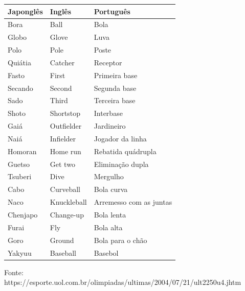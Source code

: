 		\begin{center}
			\begin{tabular}{lll}
				Japonglês & Inglês      & Português               \\\hline\hline
				Bora      & Ball        & Bola                    \\\hline
				Globo     & Glove       & Luva                    \\\hline
				Polo      & Pole        & Poste                   \\\hline
				Quiátia   & Catcher     & Receptor                \\\hline
				Fasto     & First       & Primeira base           \\\hline
				Secando   & Second      & Segunda base            \\\hline
				Sado      & Third       & Terceira base           \\\hline
				Shoto     & Shortstop   & Interbase               \\\hline
				Gaiá      & Outfielder  & Jardineiro              \\\hline
				Naiá      & Infielder   & Jogador da linha        \\\hline
				Homoran   & Home run    & Rebatida quádrupla      \\\hline
				Guetso    & Get two     & Eliminação dupla        \\\hline
				Tsuberi   & Dive        & Mergulho                \\\hline
				Cabo      & Curveball   & Bola curva              \\\hline
				Naco      & Knuckleball & Arremesso com as juntas \\\hline
				Chenjapo  & Change-up   & Bola lenta              \\\hline
				Furai     & Fly         & Bola alta               \\\hline
				Goro      & Ground      & Bola para o chão       \\\hline
				Yakyuu    & Baseball	& Basebol
			\end{tabular}

			\footnotesize{Fonte: https://esporte.uol.com.br/olimpiadas/ultimas/2004/07/21/ult2250u4.jhtm}
		\end{center}


